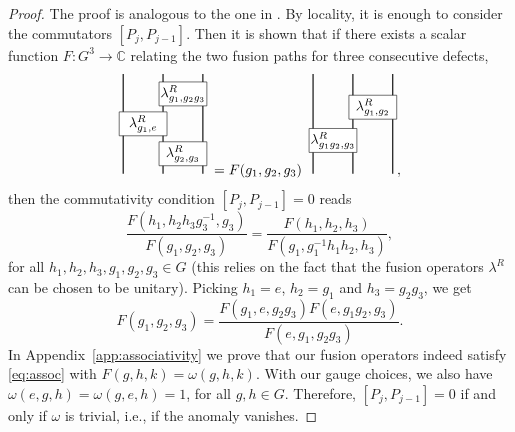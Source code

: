 \documentclass[reprint,
superscriptaddress,
amsmath,amssymb,
notitlepage,
aps,
prb,
10pt, 
tightenlines
]{revtex4-2}
\begin{document}
\begin{proof}
The proof is analogous to the one in \cite[Section~3.2]{Seifnashri}. By locality, it is enough to consider the commutators $[P_j, P_{j-1}]$. Then it is shown that if there exists a scalar function $F: G^3 \rightarrow \mathbb{C}$ relating the two fusion paths for three consecutive defects,
\begin{equation}
\begin{tikzpicture}
    \def\dx{1.0}
    \def\dya{.5}
    \def\dyb{1.25}
    \def\dyc{2.0}
    \def\dyd{2.5}
    \def\ddx{0.1}
    \def\ddy{0.3}
    \draw[thick] (0,0) --++ (0,\dyd);
    \draw[thick] (-\dx,0) --++ (0,\dyd);
    \draw[thick] (\dx,0) --++ (0,\dyd);
    \draw[fill=white] (0-\ddx,\dya-\ddy) rectangle (\dx+\ddx, \dya + \ddy);
    \draw[fill=white] (-\dx-\ddx,\dyb-\ddy) rectangle (\ddx, \dyb + \ddy);
    \draw[fill=white] (-\ddx,\dyc-\ddy) rectangle (\dx+\ddx, \dyc + \ddy);
    \node[] at (\dx/2,\dya) {$\lambda^R_{g_2,g_3}$};
    \node[] at (\dx/2,\dyc) {$\lambda^R_{g_1,g_2g_3}$};
    \node[] at (-\dx/2,\dyb) {$\lambda^R_{g_1,e}$};
\end{tikzpicture}
=
F(g_1,g_2,g_3)\;
\begin{tikzpicture}
    \def\dx{1.0}
    \def\dyb{2.5/3}
    \def\dyc{5/3}
    \def\dyd{2.5}
    \def\ddx{0.1}
    \def\ddy{0.3}
    \draw[thick] (0,0) --++ (0,\dyd);
    \draw[thick] (-\dx,0) --++ (0,\dyd);
    \draw[thick] (\dx,0) --++ (0,\dyd);
    \draw[fill=white] (-\dx-\ddx,\dyb-\ddy) rectangle (\ddx, \dyb + \ddy);
    \draw[fill=white] (-\ddx,\dyc-\ddy) rectangle (\dx+\ddx, \dyc + \ddy);
    \node[] at (\dx/2,\dyc) {$\lambda^R_{g_1,g_2}$};
    \node[] at (-\dx/2,\dyb) {$\lambda^R_{g_1g_2,g_3}$};
\end{tikzpicture}
,
\label{eq:assoc}
\end{equation}
then the commutativity condition $[P_j,P_{j-1}]=0$ reads
\begin{equation}
\frac{ F(h_1,h_2h_3g_3^{-1},g_3)}{F(g_1,g_2,g_3)}=\frac{F(h_1,h_2,h_3)}{F(g_1,g_{1}^{-1}h_1h_2,h_3)},
\end{equation}
for all $h_1,h_2,h_3,g_1,g_2,g_3\in G$ (this relies on the fact that the fusion operators $\lambda^R$ can be chosen to be unitary). Picking $h_1=e$, $h_2=g_1$ and $h_3=g_2g_3$, we get
\begin{equation}F(g_1,g_2,g_3)=\frac{F(g_1,e,g_2g_3)F(e,g_1g_2,g_3)}{F(e,g_1,g_2g_3)}.
\end{equation}
In Appendix~\ref{app:associativity} we prove that our fusion operators indeed satisfy \eqref{eq:assoc} with $F(g, h, k)=\omega(g,h,k)$. With our gauge choices, we also have $\omega(e,g,h)=\omega(g,e,h)=1$, for all $g,h\in G$. Therefore, $[P_j,P_{j-1}]=0$ if and only if $\omega$ is trivial, i.e., if the anomaly vanishes.
\end{proof}
\end{document}
